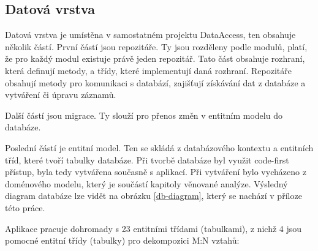 \subsection{Datová vrstva}
Datová vrstva je umístěna v samostatném projektu DataAccess, ten obsahuje několik částí. První částí jsou repozitáře. Ty jsou rozděleny podle modulů, platí, že pro každý modul existuje právě jeden repozitář. Tato část obsahuje rozhraní, která definují metody, a třídy, které implementují daná rozhraní. Repozitáře obsahují metody pro komunikaci s databází, zajišťují získávání dat z databáze a vytváření či úpravu záznamů.

Další částí jsou migrace. Ty slouží pro přenos změn v entitním modelu do databáze.

Poslední částí je entitní model. Ten se skládá z databázového kontextu a entitních tříd, které tvoří tabulky databáze. Při tvorbě databáze byl využit code-first přístup, byla tedy vytvářena současně s aplikací. Při vytváření bylo vycházeno z doménového modelu, který je součástí kapitoly věnované analýze. Výsledný diagram databáze lze vidět na obrázku \ref{db-diagram}, který se nachází v příloze této práce.

Aplikace pracuje dohromady s 23 entitními třídami (tabulkami), z nichž 4 jsou pomocné entitní třídy (tabulky) pro dekompozici M:N vztahů:

